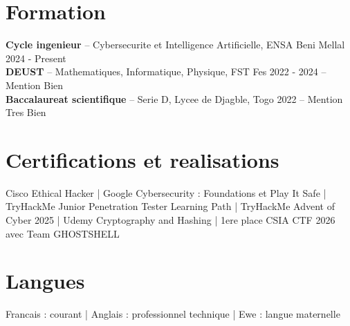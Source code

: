 \documentclass[10pt,a4paper]{article}
\newcommand{\edu}[4]{%
  \textbf{#1} -- #2 \hfill #3 #4\\[-1pt]
}
\begin{document}
\section{Formation}
\edu{Cycle ingenieur}{Cybersecurite et Intelligence Artificielle, ENSA Beni Mellal}{2024 - Present}{}
\edu{DEUST}{Mathematiques, Informatique, Physique, FST Fes}{2022 - 2024}{-- Mention Bien}
\edu{Baccalaureat scientifique}{Serie D, Lycee de Djagble, Togo}{2022}{-- Mention Tres Bien}

\section{Certifications et realisations}
Cisco Ethical Hacker | Google Cybersecurity : Foundations et Play It Safe | TryHackMe Junior Penetration Tester Learning Path | TryHackMe Advent of Cyber 2025 | Udemy Cryptography and Hashing | 1ere place CSIA CTF 2026 avec Team GHOSTSHELL

\section{Langues}
Francais : courant | Anglais : professionnel technique | Ewe : langue maternelle
\end{document}
